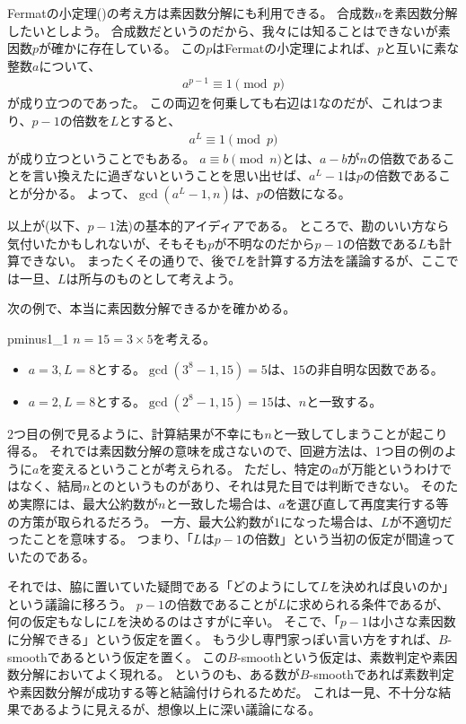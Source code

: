 Fermatの小定理()の考え方は素因数分解にも利用できる。
合成数$n$を素因数分解したいとしよう。
合成数だというのだから、我々には知ることはできないが素因数$p$が確かに存在している。
この$p$はFermatの小定理によれば、$p$と互いに素な整数$a$について、
\begin{align*}
a^{p-1} \equiv 1 \pmod{p}
\end{align*}
が成り立つのであった。
この両辺を何乗しても右辺は1なのだが、これはつまり、$p-1$の倍数を$L$とすると、
\begin{align*}
a^{L} \equiv 1 \pmod{p}
\end{align*}
が成り立つということでもある。
$a\equiv b\pmod{n}$とは、$a-b$が$n$の倍数であることを言い換えたに過ぎないということを思い出せば、$a^L-1$は$p$の倍数であることが分かる。
よって、$\gcd(a^{L}-1, n)$は、$p$の倍数になる。

以上が(以下、$p-1$法)\cite{pollard_1974}の基本的アイディアである。
ところで、勘のいい方なら気付いたかもしれないが、そもそも$p$が不明なのだから$p-1$の倍数である$L$も計算できない。
まったくその通りで、後で$L$を計算する方法を議論するが、ここでは一旦、$L$は所与のものとして考えよう。

次の例で、本当に素因数分解できるかを確かめる。

\begin{Exam}{}{pminus1_1}
$n=15=3\times5$を考える。
\begin{itemize}
\item $a=3,L=8$とする。$\gcd(3^8-1,15)=5$は、$15$の非自明な因数である。
\item $a=2,L=8$とする。$\gcd(2^8-1,15)=15$は、$n$と一致する。
\end{itemize}
\end{Exam}

2つ目の例で見るように、計算結果が不幸にも$n$と一致してしまうことが起こり得る。
それでは素因数分解の意味を成さないので、回避方法は、1つ目の例のように$a$を変えるということが考えられる。
ただし、特定の$a$が万能というわけではなく、結局$n$とのというものがあり、それは見た目では判断できない。
そのため実際には、最大公約数が$n$と一致した場合は、$a$を選び直して再度実行する等の方策が取られるだろう。
一方、最大公約数が$1$になった場合は、$L$が不適切だったことを意味する。
つまり、「$L$は$p-1$の倍数」という当初の仮定が間違っていたのである。

それでは、脇に置いていた疑問である「どのようにして$L$を決めれば良いのか」という議論に移ろう。
$p-1$の倍数であることが$L$に求められる条件であるが、何の仮定もなしに$L$を決めるのはさすがに辛い。
そこで、「$p-1$は小さな素因数に分解できる」という仮定を置く。
もう少し専門家っぽい言い方をすれば、$B$-smoothであるという仮定を置く。
この$B$-smoothという仮定は、素数判定や素因数分解においてよく現れる。
というのも、ある数が$B$-smoothであれば素数判定や素因数分解が成功する等と結論付けられるためだ。
これは一見、不十分な結果であるように見えるが、想像以上に深い議論になる。

